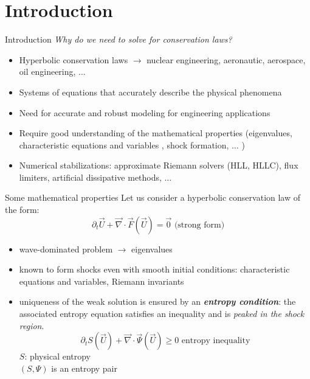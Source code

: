 \documentclass[xcolor=dvipsnames,10pt]{beamer}
\renewcommand{\div}{\vec{\nabla}\! \cdot \!}
\newcommand{\tcr}[1]{\textcolor{red}{#1}}
\begin{document}
\section{Introduction}
\begin{frame}{Introduction}
\emph{Why do we need to solve for conservation laws?}
\begin{block}{}
\begin{itemize}
\setlength{\itemsep}{10pt}
\item Hyperbolic conservation laws $\longrightarrow$ nuclear engineering, aeronautic, aerospace, oil engineering, $\dots$
\item Systems of equations that accurately describe the physical phenomena
\item Need for accurate and robust modeling for engineering applications
\item Require good understanding of the mathematical properties (eigenvalues, characteristic equations and variables , shock formation, $\dots$ )
\item Numerical stabilizations: approximate Riemann solvers (HLL, HLLC), flux limiters, artificial dissipative methods, $\dots$
\end{itemize}
\end{block}
\end{frame}
\begin{frame}{Some mathematical properties}
Let us consider a hyperbolic conservation law of the form:
\begin{equation} \partial_t \vec{U} + \div \vec{F} ( \vec{U} ) = \vec{0}  \nonumber \text{ (strong form)}\end{equation} 
\begin{itemize}
\item wave-dominated problem $\to$ eigenvalues
\item known to form shocks even with smooth initial conditions: characteristic equations and variables, Riemann invariants
\item uniqueness of the weak solution is ensured by an \textbf{\emph{entropy condition}}: the associated entropy equation satisfies an inequality and is \emph{peaked in the shock region}.
\begin{equation}
\partial_t S ( \vec{U} ) + \div \vec{\Psi} ( \vec{U} ) \geq 0 \text{ entropy inequality} \nonumber
\end{equation}
$S$: physical entropy \\
$\left( S, \Psi \right)$ is an entropy pair
\end{itemize}
\end{frame}
\end{document}

